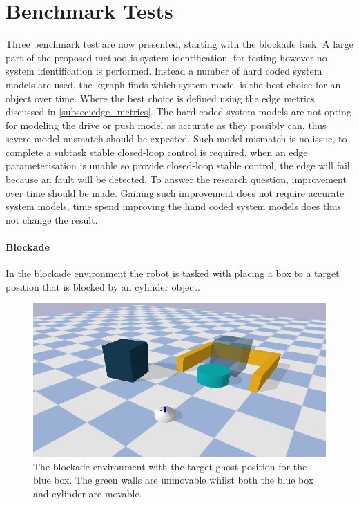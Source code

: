 \section{Benchmark Tests}%
\label{sec:benchmark_tests}
Three benchmark test are now presented, starting with the blockade task. A large part of the proposed method is system identification, for testing however no system identification is performed. Instead a number of hard coded system models are used, the \ac{kgraph} finds which system model is the best choice for an object over time. Where the best choice is defined using the edge metrics discussed in \cref{subsec:edge_metrics}. The hard coded system models are not opting for modeling the drive or push model as accurate as they possibly can, thus severe model mismatch should be expected. Such model mismatch is no issue, to complete a subtask stable closed-loop control is required, when an edge parameterisation is unable so provide closed-loop stable control, the edge will fail because an fault will be detected. To answer the research question, improvement over time should be made. Gaining such improvement does not require accurate system models, time spend improving the hand coded system models does thus not change the result.\bs


\paragraph{Blockade} In the blockade environment the robot is tasked with placing a box to a target position that is blocked by an cylinder object.\bs
\begin{figure}[H]
    \centering
    \includegraphics[width=13cm]{figures/tests/blockade}
    \caption{The blockade environment with the target ghost position for the blue box. The green walls are unmovable whilst both the blue box and cylinder are movable.}%
    \label{fig:benchmark_blockade}
\end{figure}

